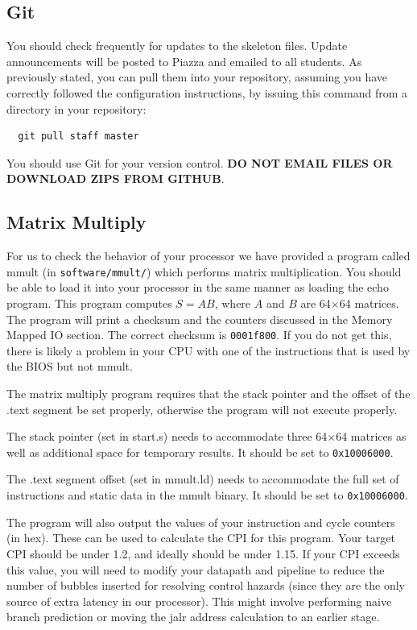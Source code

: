 \documentclass[11pt]{article}
\begin{document}
\subsection{Git}
You should check frequently for updates to the skeleton files. Update announcements will be posted to Piazza and emailed to all students. As previously stated, you can pull them into your repository, assuming you have correctly followed the configuration instructions, by issuing this command from
a directory in your repository:
\begin{verbatim}
  git pull staff master
\end{verbatim}

You should use Git for your version control. \textbf{DO NOT EMAIL FILES OR DOWNLOAD ZIPS FROM GITHUB}.

\subsection{Matrix Multiply}
\label{mmult}
For us to check the behavior of your processor we have provided a program called mmult (in \verb|software/mmult/|) which performs matrix multiplication. You should be able to load it into your processor in the same manner as loading the echo program. This program computes $S=AB$, where $A$ and $B$ are 64$\times$64 matrices. The program will print a checksum and the counters discussed in the Memory Mapped IO section. The correct checksum is \verb|0001f800|. If you do not get this, there is likely a problem in your CPU with one of the instructions that is used by the BIOS but not mmult. 

The matrix multiply program requires that the stack pointer and the offset of the .text segment be set properly, otherwise the program will not execute properly. 

The stack pointer (set in start.s) needs to accommodate three 64$\times$64 matrices as well as additional space for temporary results. It should be set to \verb|0x10006000|.

The .text segment offset (set in mmult.ld) needs to accommodate the full set of instructions and static data in the mmult binary. It should be set to \verb|0x10006000|.

The program will also output the values of your instruction and cycle counters (in hex). These can be used to calculate the CPI for this program. Your target CPI should be under 1.2, and ideally should be under 1.15. If your CPI exceeds this value, you will need to modify your datapath and pipeline to reduce the number of bubbles inserted for resolving control hazards (since they are the only source of extra latency in our processor). This might involve performing naive branch prediction or moving the jalr address calculation to an earlier stage.
\end{document}
